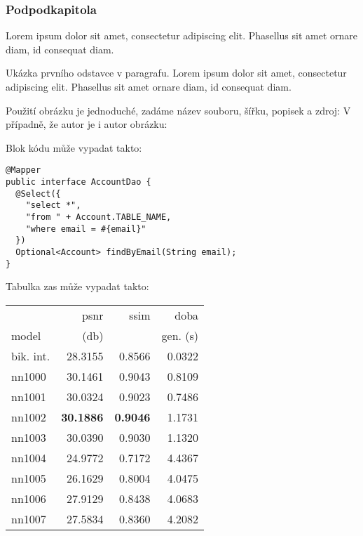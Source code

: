 		\subsubsection{Podpodkapitola}

		Lorem ipsum dolor sit amet, consectetur adipiscing elit. Phasellus sit amet ornare diam, id consequat diam.


			\noindent Ukázka prvního odstavce v paragrafu. Lorem ipsum dolor sit amet, consectetur adipiscing elit. Phasellus sit amet ornare diam, id consequat diam.



			Použití obrázku je jednoduché, zadáme název souboru, šířku, popisek a zdroj:
			V případně, že autor je i autor obrázku:


			Blok kódu může vypadat takto:

			\begin{codeblock}
				\begin{verbatim}
@Mapper
public interface AccountDao {
  @Select({
    "select *",
    "from " + Account.TABLE_NAME,
    "where email = #{email}"
  })
  Optional<Account> findByEmail(String email);
}
				\end{verbatim}
			\end{codeblock}

			Tabulka zas může vypadat takto:

			\begin{table}[hbt!]
				\centering
				\begin{tabular}{| l | r | r | r | }
					\hline
					&        psnr &      ssim &      doba  \\
					model &       (db)    &           & gen. (s) \\
					\hline
					bik. int. & 28.3155 & 0.8566 & 0.0322 \\
					nn1000    & 30.1461 & 0.9043 & 0.8109 \\
					nn1001    & 30.0324 & 0.9023 & 0.7486 \\
					nn1002    & \textbf{30.1886} & \textbf{0.9046} & 1.1731 \\
					nn1003    & 30.0390 & 0.9030 & 1.1320 \\
					nn1004    & 24.9772 & 0.7172 & 4.4367 \\
					nn1005    & 26.1629 & 0.8004 & 4.0475 \\
					nn1006    & 27.9129 & 0.8438 & 4.0683 \\
					nn1007    & 27.5834 & 0.8360 & 4.2082 \\
					\hline
				\end{tabular}
			\end{table}

